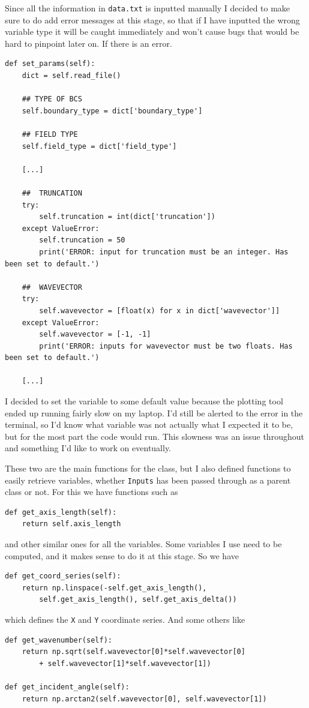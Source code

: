 Since all the information in \verb!data.txt! is inputted manually I decided to make sure to do add error messages at this stage, so that if I have inputted the wrong variable type it will be caught immediately and won't cause bugs that would be hard to pinpoint later on. If there is an error.

\begin{lstlisting}
def set_params(self):
    dict = self.read_file()

    ## TYPE OF BCS
    self.boundary_type = dict['boundary_type']

    ## FIELD TYPE
    self.field_type = dict['field_type']

    [...]

    ##  TRUNCATION
    try:
        self.truncation = int(dict['truncation'])
    except ValueError:
        self.truncation = 50
        print('ERROR: input for truncation must be an integer. Has been set to default.')

    ##  WAVEVECTOR
    try:
        self.wavevector = [float(x) for x in dict['wavevector']]
    except ValueError:
        self.wavevector = [-1, -1]
        print('ERROR: inputs for wavevector must be two floats. Has been set to default.')

    [...]
\end{lstlisting}

I decided to set the variable to some default value because the plotting tool ended up running fairly slow on my laptop. I'd still be alerted to the error in the terminal, so I'd know what variable was not actually what I expected it to be, but for the most part the code would run. This slowness was an issue throughout and something I'd like to work on eventually.

These two are the main functions for the class, but I also defined functions to easily retrieve variables, whether \verb!Inputs! has been passed through as a parent class or not. For this we have functions such as
\begin{lstlisting}
def get_axis_length(self):
    return self.axis_length\end{lstlisting}
and other similar ones for all the variables. Some variables I use need to be computed, and it makes sense to do it at this stage. So we have
\begin{lstlisting}
def get_coord_series(self):
    return np.linspace(-self.get_axis_length(),
        self.get_axis_length(), self.get_axis_delta())
\end{lstlisting}
which defines the \verb!X! and \verb!Y! coordinate series. And some others like
\begin{lstlisting}
def get_wavenumber(self):
    return np.sqrt(self.wavevector[0]*self.wavevector[0]
        + self.wavevector[1]*self.wavevector[1])

def get_incident_angle(self):
    return np.arctan2(self.wavevector[0], self.wavevector[1])
\end{lstlisting}

